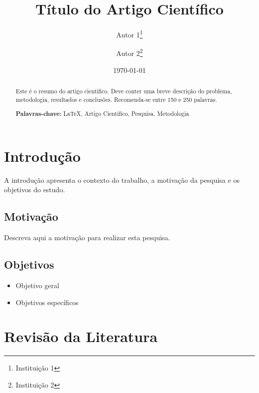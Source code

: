 

\usepackage[utf8]{inputenc}
\usepackage[portuguese]{babel}
\usepackage[T1]{fontenc}
\usepackage{graphicx}
\usepackage{amsmath}
\usepackage{cite}
\usepackage{hyperref}

\graphicspath{{imagens/}}

\title{Título do Artigo Científico}
\author{Autor 1\thanks{Instituição 1} \and Autor 2\thanks{Instituição 2}}
\date{\today}



\maketitle

\begin{abstract}
Este é o resumo do artigo científico. Deve conter uma breve descrição do problema, metodologia, resultados e conclusões. Recomenda-se entre 150 e 250 palavras.

\textbf{Palavras-chave:} LaTeX, Artigo Científico, Pesquisa, Metodologia
\end{abstract}

\section{Introdução}

A introdução apresenta o contexto do trabalho, a motivação da pesquisa e os objetivos do estudo.

\subsection{Motivação}

Descreva aqui a motivação para realizar esta pesquisa.

\subsection{Objetivos}

\begin{itemize}
  \item Objetivo geral
  \item Objetivos específicos
\end{itemize}

\section{Revisão da Literatura}

